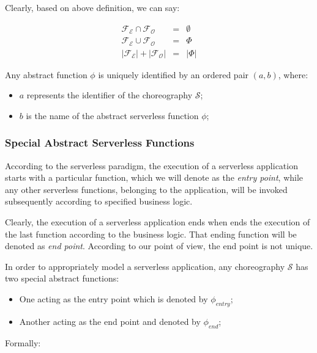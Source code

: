 Clearly, based on above definition, we can say: 

\begin{eqnarray}
\mathscr{F_E} \cap \mathscr{F_O} & = & \emptyset \\
\mathscr{F_E} \cup \mathscr{F_O} & = & \Phi \\
|\mathscr{F_E}| + |\mathscr{F_O}| &=& |\Phi| 
\end{eqnarray}

Any abstract function $\phi$ is uniquely identified by an ordered pair $(a, b)$, where:
\begin{itemize}
	\item $a$ represents the identifier of the choreography $\mathcal{S}$;
	\item $b$ is the name of the abstract serverless function $\phi$;
\end{itemize}


\subsubsection{Special Abstract Serverless Functions} 

According to the serverless paradigm, the execution of a serverless application starts with a particular function, which we will denote as the \textit{entry point}, while any other serverless functions, belonging to the application, will be invoked subsequently according to specified business logic. 

Clearly, the execution of a serverless application ends when ends the execution of the last function according to the business logic. That ending function will be denoted as \textit{end point}. According to our point of view, the end point is not unique.

In order to appropriately model a serverless application, any choreography $\mathcal{S}$ has two special abstract functions:

\begin{itemize}
	\item One acting as the entry point which is denoted by $\phi_{entry}$;
	\item Another acting as the end point and denoted by $\phi_{end}$;
\end{itemize}

Formally:

